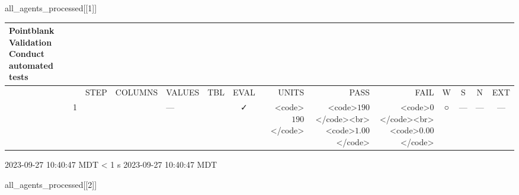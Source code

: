 \documentclass[
  letterpaper,
  DIV=11,
  numbers=noendperiod]{scrreprt}
\newenvironment{Shaded}{\begin{snugshade}}{\end{snugshade}}
\newcommand{\DecValTok}[1]{\textcolor[rgb]{0.68,0.00,0.00}{#1}}
\newcommand{\NormalTok}[1]{\textcolor[rgb]{0.00,0.23,0.31}{#1}}
\begin{document}
\begin{Shaded}
\begin{Highlighting}[]
\NormalTok{all\_agents\_processed[[}\DecValTok{1}\NormalTok{]]}
\end{Highlighting}
\end{Shaded}

\setlength{\LTpost}{0mm}
\begin{longtable}{lrlllccrrrcccc}
\caption*{
{\large Pointblank Validation} \\ 
{\small Conduct automated tests}
} \\ 
\toprule
 &  & STEP & COLUMNS & VALUES & TBL & EVAL & UNITS & PASS & FAIL & W & S & N & EXT \\ 
\midrule
 & 1 &  &  & — &                                                              & ✓ & <code>$190$</code> & <code>$190$</code><br><code>$1.00$</code> & <code>$0$</code><br><code>$0.00$</code> & ○ & --- & --- & --- \\ 
\bottomrule
\end{longtable}
\begin{minipage}{\linewidth}
2023-09-27 10:40:47 MDT
\textless{} 1 s
2023-09-27 10:40:47 MDT\\
\end{minipage}

\begin{Shaded}
\begin{Highlighting}[]
\NormalTok{all\_agents\_processed[[}\DecValTok{2}\NormalTok{]]}
\end{Highlighting}
\end{Shaded}
\end{document}
